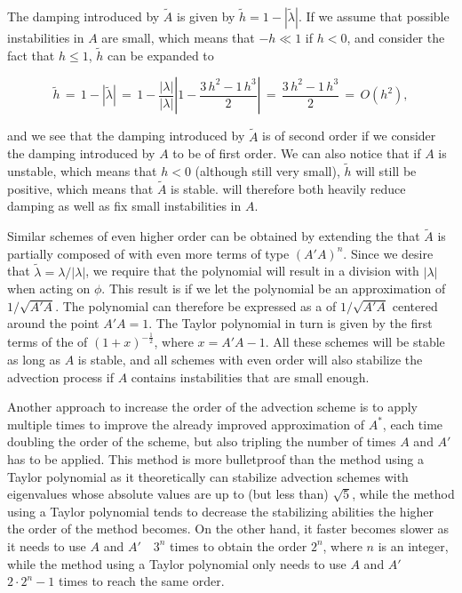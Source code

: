 The damping introduced by $\tilde{A}$ is given by $\tilde{h} = 1 - |\tilde{\lambda}|$. If we assume that possible instabilities in $A$ are small, which means that $-h \ll 1$ if $h < 0$, and consider the fact that $h \leq 1$, $\tilde{h}$ can be expanded to

\begin{equation}
\tilde{h} \,=\, 1 - |\tilde{\lambda}| \,=\, 1 - \frac{|\lambda|}{|\lambda|}\left|1 - \displaystyle\frac{3\,h^2 - 1\,h^3}{2}\right| \,=\, \displaystyle\frac{3\,h^2 - 1\,h^3}{2} \,=\, O(h^2),
\end{equation}

and we see that the damping introduced by $\tilde{A}$ is of second order if we consider the damping introduced by $A$ to be of first order. We can also notice that if $A$ is unstable, which means that $h < 0$ (although still very small), $\tilde{h}$ will still be positive, which means that $\tilde{A}$ is stable. \BFECC will therefore both heavily reduce damping as well as fix small instabilities in $A$.

Similar schemes of even higher order can be obtained by extending the \polynomial that $\tilde{A}$ is partially composed of with even more terms of type $(A'A)^n$. Since we desire that $\tilde{\lambda} = \lambda/|\lambda|$, we require that the polynomial will result in a division with $|\lambda|$ when acting on $\phi$. This result is \approximated if we let the polynomial be an approximation of $1/\sqrt{A'A}$. The polynomial can therefore be expressed as a  of $1/\sqrt{A'A}$ centered around the point $A'A = 1$. The Taylor polynomial in turn is given by the first terms of the  of $(1+x)^{-\frac{1}{2}}$, where $x = A'A - 1$. All these schemes will be stable as long as $A$ is stable, and all schemes with even order will also stabilize the advection process if $A$ contains instabilities that are small enough.

Another approach to increase the order of the advection scheme is to apply \BFECC multiple times to improve the already improved approximation of $A^*$, each time doubling the order of the scheme, but also tripling the number of times $A$ and $A'$ has to be applied. This method is more bulletproof than the method using a Taylor polynomial as it theoretically can stabilize advection schemes with eigenvalues whose absolute values are up to (but less than) $\sqrt{5}$, while the method using a Taylor polynomial tends to decrease the stabilizing abilities the higher the order of the method becomes. On the other hand, it faster becomes slower as it needs to use $A$ and $A'$\ \ $3^n$ times to obtain the order $2^n$, where $n$ is an integer, while the method using a Taylor polynomial only needs to use $A$ and $A'$\ \ $2\cdot 2^n - 1$ times to reach the same order.

